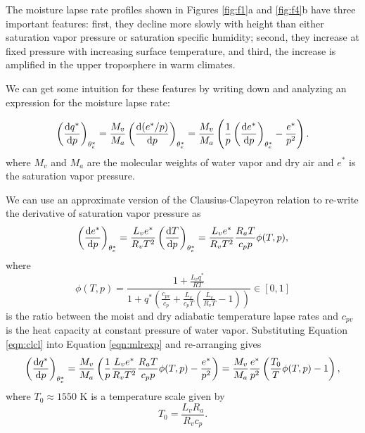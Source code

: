 \documentclass[twocol]{ametsoc}
\begin{document}
\appendix[A]
\label{app:moisture_lapse_rate}

The moisture lapse rate profiles shown in Figures \ref{fig:f1}a and \ref{fig:f4}b have three important features: first, they decline more slowly with height than either saturation vapor pressure or saturation specific humidity; second, they increase at fixed pressure with increasing surface temperature, and third, the increase is amplified in the upper troposphere in warm climates.

We can get some intuition for these features by writing down and analyzing an expression for the moisture lapse rate:

\begin{equation} \label{eqn:mlrexp}
\begin{split}
    \left(\frac{{\rm d}q^*}{{\rm d}p}\right)_{\theta_e^*} = \frac{M_v}{M_a}\left(\frac{{\rm d}(e^*/p)}{{\rm d}p}\right)_{\theta_e^*} = \frac{M_v}{M_a} \left ( \frac{1}{p} \left(\frac{{\rm d}e^*}{{\rm d}p}\right)_{\theta_e^*} - \frac{e^*}{p^2} \right ).
\end{split}
\end{equation}
where $M_v$ and $M_a$ are the molecular weights of water vapor and dry air and $e^*$ is the saturation vapor pressure.

We can use an approximate version of the Clausius-Clapeyron relation \citep[][]{Pierrehumbert2010PrinciplesClimate} to re-write the derivative of saturation vapor pressure as
\begin{equation} \label{eqn:clcl}
\begin{split}
    \left(\frac{{\rm d}e^*}{{\rm d}p}\right)_{\theta_e^*} = \frac{L_v e^*}{R_v T^2} \left(\frac{{\rm d}T}{{\rm d}p}\right)_{\theta_e^*} = \frac{L_v e^*}{R_v T^2} \frac{R_a T}{c_p p} \phi(T,p),
\end{split}
\end{equation}
where 
\begin{equation}
    \phi(T,p) = \frac{1 + \frac{L_v q^*}{R T}}{1 + q^* \left (\frac{c_{pv}}{c_p} + \frac{L_v}{c_p T}\left( \frac{L_v}{R_v T} - 1\right) \right)} \in [0,1]
\end{equation}
is the ratio between the moist and dry adiabatic temperature lapse rates \citep[e.g.][]{Pierrehumbert2010PrinciplesClimate} and $c_{pv}$ is the heat capacity at constant pressure of water vapor. Substituting Equation \ref{eqn:clcl} into Equation \ref{eqn:mlrexp} and re-arranging gives
\begin{equation} \label{eqn:mlr}
\begin{split}
    \left(\frac{{\rm d}q^*}{{\rm d}p}\right)_{\theta_e^*} = \frac{M_v}{M_a} \left ( \frac{1}{p} \frac{L_v e^*}{R_v T^2} \frac{R_a T}{c_p p} \phi(T,p) - \frac{e^*}{p^2} \right ) = \frac{M_v}{M_a} \frac{e^*}{p^2} \left ( \frac{T_0}{T} \phi(T,p) - 1 \right ),
\end{split}
\end{equation}
where $T_0 \approx 1550$ K is a temperature scale given by
\begin{equation}
T_0 = \frac{L_v R_a}{R_v c_p}.
\end{equation}
\end{document}
